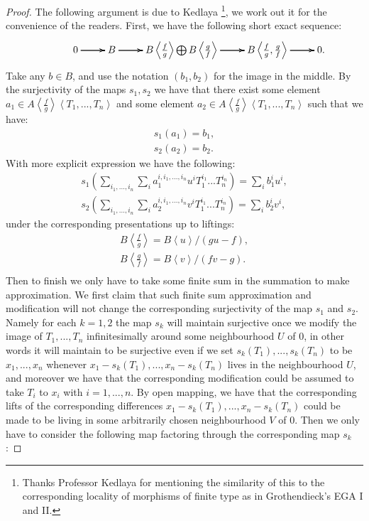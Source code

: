 \documentclass[12pt]{amsart}
\theoremstyle{definition}
\numberwithin{equation}{section}
\begin{document}
\begin{proof}
The following argument is due to Kedlaya \footnote[1]{Thanks Professor Kedlaya for mentioning the similarity of this to the corresponding locality of morphisms of finite type as in Grothendieck's EGA I and II.}, we work out it for the convenience of the readers. First, we have the following short exact sequence:
\[
\xymatrix@C+0pc@R+0pc{
&0 \ar[r] \ar[r] \ar[r] &B \ar[r] \ar[r] \ar[r] &B\left<\frac{f}{g}\right>\bigoplus B\left<\frac{g}{f}\right> \ar[r] \ar[r] \ar[r] &B\left<\frac{f}{g},\frac{g}{f}\right> \ar[r] \ar[r] \ar[r] &0.
}
\]
Take any $b\in B$, and use the notation $(b_1,b_2)$ for the image in the middle. By the surjectivity of the maps $s_1,s_2$ we have that there exist some element $a_1\in A\left<\frac{f}{g}\right>\left<T_1,...,T_n\right>$ and some element $a_2\in A\left<\frac{f}{g}\right>\left<T_1,...,T_n\right>$ such that we have:
\begin{align}
s_1(a_1)=b_1,\\
s_2(a_2)=b_2.	
\end{align}
With more explicit expression we have the following:
\begin{align}
s_1(\sum_{i_1,...,i_n}\sum_{i} a_1^{i,i_1,...,i_n}u^iT_1^{i_1}...T_n^{i_n})=\sum_i b_1^iu^i,\\
s_2(\sum_{i_1,...,i_n}\sum_{i} a_2^{i,i_1,...,i_n}v^iT_1^{i_1}...T_n^{i_n})=\sum_i b_2^iv^i,	
\end{align}	
under the corresponding presentations up to liftings:
\begin{align}
B\left<\frac{f}{g}\right>=B\left<u\right>/(gu-f),\\
B\left<\frac{g}{f}\right>=B\left<v\right>/(fv-g).\\	
\end{align}
Then to finish we only have to take some finite sum in the summation to make approximation. We first claim that such finite sum approximation and modification will not change the corresponding surjectivity of the map $s_1$ and $s_2$. Namely for each $k=1,2$ the map $s_k$ will maintain surjective once we modify the image of $T_1,...,T_n$ infinitesimally around some neighbourhood $U$ of $0$, in other words it will maintain to be surjective even if we set $s_k(T_1),...,s_k(T_n)$ to be $x_1,...,x_n$ whenever $x_1-s_k(T_1),...,x_n-s_k(T_n)$ lives in the neighbourhood $U$, and moreover we have that the corresponding modification could be assumed to take $T_i$ to $x_i$ with $i=1,...,n$. By open mapping, we have that the corresponding lifts of the corresponding differences $x_1-s_k(T_1),...,x_n-s_k(T_n)$ could be made to be living in some arbitrarily chosen neighbourhood $V$ of $0$. Then we only have to consider the following map factoring through the corresponding map $s_k$:

\end{proof}
\end{document}
